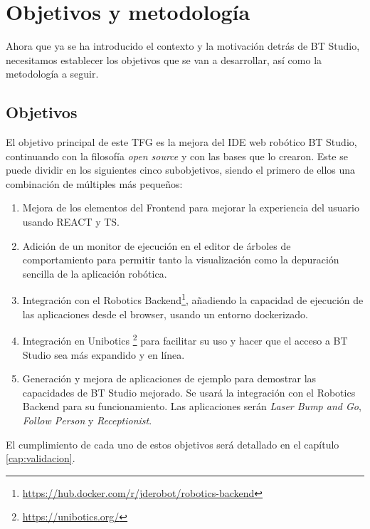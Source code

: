 \chapter{Objetivos y metodología}\label{cap:planificación}

Ahora que ya se ha introducido el contexto y la motivación detrás de BT Studio, necesitamos establecer los objetivos que se van a desarrollar, así como la metodología a seguir.

\section{Objetivos}

El objetivo principal de este TFG es la mejora del IDE web robótico BT Studio, continuando con la filosofía \textit{open source} y con las bases que lo crearon. Este se puede dividir en los siguientes cinco subobjetivos, siendo el primero de ellos una combinación de múltiples más pequeños:  

\begin{enumerate}

    \item Mejora de los elementos del Frontend para mejorar la experiencia del usuario usando REACT y TS. 
  
    \item Adición de un monitor de ejecución en el editor de árboles de comportamiento para permitir tanto la visualización como la depuración sencilla de la aplicación robótica. 
  
    \item Integración con el Robotics Backend\footnote{\url{https://hub.docker.com/r/jderobot/robotics-backend}}, añadiendo la capacidad de ejecución de las aplicaciones desde el browser, usando un entorno dockerizado. 

    \item Integración en Unibotics \footnote{\url{https://unibotics.org/}} para facilitar su uso y hacer que el acceso a BT Studio sea más expandido y en línea. 
  
    \item Generación y mejora de aplicaciones de ejemplo para demostrar las capacidades de BT Studio mejorado. Se usará la integración con el Robotics Backend para su funcionamiento. Las aplicaciones serán \textit{Laser Bump and Go}, \textit{Follow Person} y  \textit{Receptionist}.
\end{enumerate}

El cumplimiento de cada uno de estos objetivos será detallado en el capítulo \ref{cap:validacion}.

